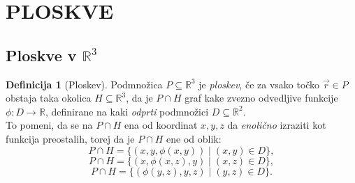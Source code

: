 \documentclass[11pt]{article}
\theoremstyle{definition}
\newtheorem{definicija}{Definicija}[section]
\theoremstyle{definition}
\theoremstyle{definition}
\begin{document}
\pagebreak


\section{PLOSKVE}
\vspace{0.5cm}


\subsection{Ploskve v $\mathbb{R}^3$}
\vspace{0.5cm}

\begin{definicija}[Ploskev]

Podmnožica $P \subseteq \mathbb{R}^3$ je \textit{ploskev}, če za vsako točko $\vec{r} \in P$ obstaja taka okolica $H \subseteq \mathbb{R}^3$, da je $P \cap H$ graf kake zvezno odvedljive funkcije $\phi: D \rightarrow \mathbb{R}$, definirane na kaki \textit{odprti} podmnožici $D \subseteq \mathbb{R}^2$. \\
To pomeni, da se na $P \cap H$ ena od koordinat $x, y, z$ da \textit{enolično} izraziti kot funkcija preostalih, torej da je $P \cap H$ ene od oblik:
$$P \cap H = \{(x, y, \phi(x, y)) \mid (x, y) \in D\},$$
$$P \cap H = \{(x, \phi(x, z), y) \mid (x, z) \in D\},$$
$$P \cap H = \{(\phi(y, z), y, z) \mid (y, z) \in D\}.$$

\end{definicija}
\vspace{0.5cm}
\end{document}
